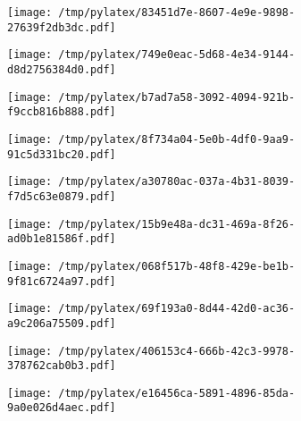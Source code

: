 \documentclass{article}
\begin{document}
\begin{figure}[htbp]
\begin{subfigure}[b]{.3\linewidth}
\texttt{[image: /tmp/pylatex/83451d7e-8607-4e9e-9898-27639f2db3dc.pdf]}
\end{subfigure}
\begin{subfigure}[b]{.3\linewidth}
\texttt{[image: /tmp/pylatex/749e0eac-5d68-4e34-9144-d8d2756384d0.pdf]}
\end{subfigure}
\begin{subfigure}[b]{.3\linewidth}
\texttt{[image: /tmp/pylatex/b7ad7a58-3092-4094-921b-f9ccb816b888.pdf]}
\end{subfigure}
\begin{subfigure}[b]{.3\linewidth}
\texttt{[image: /tmp/pylatex/8f734a04-5e0b-4df0-9aa9-91c5d331bc20.pdf]}
\end{subfigure}
\begin{subfigure}[b]{.3\linewidth}
\texttt{[image: /tmp/pylatex/a30780ac-037a-4b31-8039-f7d5c63e0879.pdf]}
\end{subfigure}
\begin{subfigure}[b]{.3\linewidth}
\texttt{[image: /tmp/pylatex/15b9e48a-dc31-469a-8f26-ad0b1e81586f.pdf]}
\end{subfigure}
\begin{subfigure}[b]{.3\linewidth}
\texttt{[image: /tmp/pylatex/068f517b-48f8-429e-be1b-9f81c6724a97.pdf]}
\end{subfigure}
\begin{subfigure}[b]{.3\linewidth}
\texttt{[image: /tmp/pylatex/69f193a0-8d44-42d0-ac36-a9c206a75509.pdf]}
\end{subfigure}
\begin{subfigure}[b]{.3\linewidth}
\texttt{[image: /tmp/pylatex/406153c4-666b-42c3-9978-378762cab0b3.pdf]}
\end{subfigure}
\begin{subfigure}[b]{.3\linewidth}
\texttt{[image: /tmp/pylatex/e16456ca-5891-4896-85da-9a0e026d4aec.pdf]}
\end{subfigure}
\end{figure}
\end{document}
